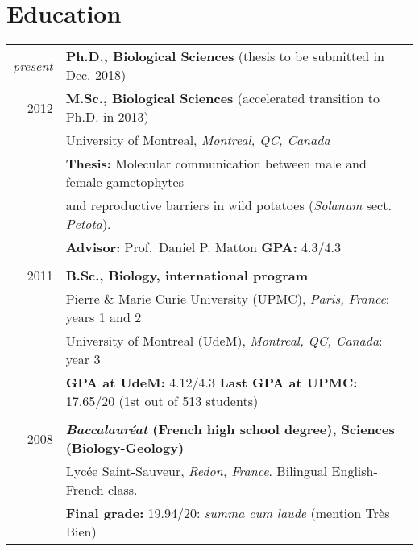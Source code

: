 \documentclass[letterpaper,10pt]{article}
\begin{document}
\section{Education}
\begin{tabular}{r|p{15cm}}

  \emph{present}
  & \textbf{Ph.D., Biological Sciences}
    \small{(thesis to be submitted in Dec. 2018)} \\
  2012
  & \textbf{M.Sc., Biological Sciences}
    \small{(accelerated transition to Ph.D. in 2013)} \vspace{0.5mm} \\
  & \hspace{1.5mm} University of Montreal, \emph{Montreal, QC, Canada} \\
  & \hspace{1.5mm} {\small \textbf{Thesis:} Molecular communication between male
  and female gametophytes} \\
  & \hspace{1.5mm} {\small \phantom{\textbf{Thesis:}} and reproductive barriers
  in wild potatoes (\emph{Solanum} sect. \emph{Petota}).} \\
  & \hspace{1.5mm} {\small \textbf{Advisor:} Prof.~Daniel P. Matton
    \hspace{1mm} \textbf{GPA:} 4.3/4.3} \\

 \multicolumn{2}{c}{} \\

 2011 & \textbf{B.Sc., Biology, international program} \vspace{0.5mm} \\
 & \hspace{1.5mm} Pierre \& Marie Curie University (UPMC),
   \emph{Paris, France}: years 1 and 2 \\
 & \hspace{1.5mm} University of Montreal (UdeM),
   \emph{Montreal, QC, Canada}: year 3 \\
 & \hspace{1.5mm} {\small \textbf{GPA at UdeM:} 4.12/4.3 \hspace{2mm}
   \textbf{Last GPA at UPMC:} 17.65/20  (1st out of 513 students)} \\

 \multicolumn{2}{c}{} \\

 2008
 & \textbf{\emph{Baccalauréat} (French high school degree),
   Sciences (Biology-Geology)}
   \vspace{0.5mm} \\
 & \hspace{1.5mm} Lycée Saint-Sauveur, \emph{Redon, France}.
   Bilingual English-French class. \\
 & \hspace{1.5mm} {\small \textbf{Final grade:} 19.94/20:
   \emph{summa cum laude} (mention Très Bien)} \\

\end{tabular}
\end{document}
